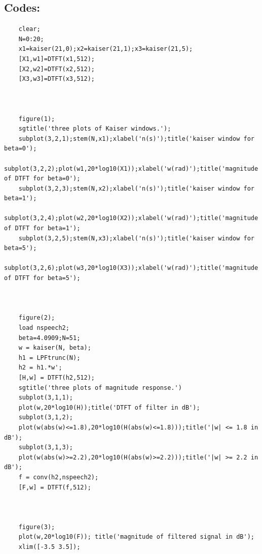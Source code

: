 \documentclass[onecolumn,oneside]{SUSTechHomework}
\begin{document}
\subsection*{Codes:}
\begin{lstlisting}[title=q8\_3.m]
	% For both Questions 1 and 2.
	clear;
	N=0:20;
	x1=kaiser(21,0);x2=kaiser(21,1);x3=kaiser(21,5);
	[X1,w1]=DTFT(x1,512);
	[X2,w2]=DTFT(x2,512);
	[X3,w3]=DTFT(x3,512);
	
	

	figure(1);
	sgtitle('three plots of Kaiser windows.');
	subplot(3,2,1);stem(N,x1);xlabel('n(s)');title('kaiser window for beta=0');
	subplot(3,2,2);plot(w1,20*log10(X1));xlabel('w(rad)');title('magnitude of DTFT for beta=0');
	subplot(3,2,3);stem(N,x2);xlabel('n(s)');title('kaiser window for beta=1');
	subplot(3,2,4);plot(w2,20*log10(X2));xlabel('w(rad)');title('magnitude of DTFT for beta=1');
	subplot(3,2,5);stem(N,x3);xlabel('n(s)');title('kaiser window for beta=5');
	subplot(3,2,6);plot(w3,20*log10(X3));xlabel('w(rad)');title('magnitude of DTFT for beta=5');
	
	

	figure(2);
	load nspeech2;
	beta=4.0909;N=51;
	w = kaiser(N, beta);
	h1 = LPFtrunc(N);
	h2 = h1.*w';
	[H,w] = DTFT(h2,512);
	sgtitle('three plots of magnitude response.')
	subplot(3,1,1);
	plot(w,20*log10(H));title('DTFT of filter in dB');
	subplot(3,1,2);
	plot(w(abs(w)<=1.8),20*log10(H(abs(w)<=1.8)));title('|w| <= 1.8 in dB');
	subplot(3,1,3);
	plot(w(abs(w)>=2.2),20*log10(H(abs(w)>=2.2)));title('|w| >= 2.2 in dB');
	f = conv(h2,nspeech2);
	[F,w] = DTFT(f,512);
	
	

	figure(3);
	plot(w,20*log10(F)); title('magnitude of filtered signal in dB');
	xlim([-3.5 3.5]);		
\end{lstlisting}
\newpage
\end{document}

